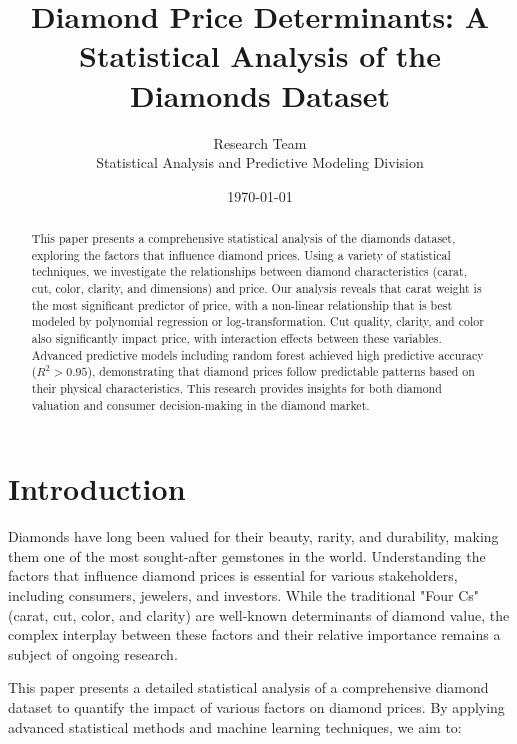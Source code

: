 \documentclass[11pt,a4paper]{article}
\begin{document}
\title{\textbf{Diamond Price Determinants: A Statistical Analysis of the Diamonds Dataset}}
\author{Research Team\\Statistical Analysis and Predictive Modeling Division}
\date{\today}

\maketitle

\begin{abstract}
This paper presents a comprehensive statistical analysis of the diamonds dataset, exploring the factors that influence diamond prices. Using a variety of statistical techniques, we investigate the relationships between diamond characteristics (carat, cut, color, clarity, and dimensions) and price. Our analysis reveals that carat weight is the most significant predictor of price, with a non-linear relationship that is best modeled by polynomial regression or log-transformation. Cut quality, clarity, and color also significantly impact price, with interaction effects between these variables. Advanced predictive models including random forest achieved high predictive accuracy ($R^2 > 0.95$), demonstrating that diamond prices follow predictable patterns based on their physical characteristics. This research provides insights for both diamond valuation and consumer decision-making in the diamond market.
\end{abstract}

\tableofcontents
\newpage

\section{Introduction}

Diamonds have long been valued for their beauty, rarity, and durability, making them one of the most sought-after gemstones in the world. Understanding the factors that influence diamond prices is essential for various stakeholders, including consumers, jewelers, and investors. While the traditional "Four Cs" (carat, cut, color, and clarity) are well-known determinants of diamond value, the complex interplay between these factors and their relative importance remains a subject of ongoing research.

This paper presents a detailed statistical analysis of a comprehensive diamond dataset to quantify the impact of various factors on diamond prices. By applying advanced statistical methods and machine learning techniques, we aim to:
\end{document}
